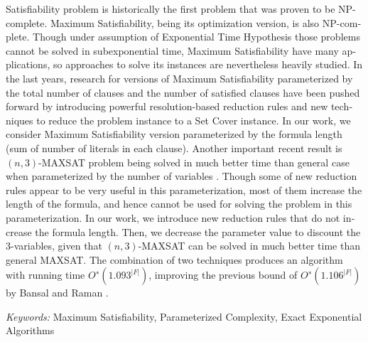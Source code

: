 \begin{otherlanguage}{english}
 Satisfiability problem is historically the first problem that was proven to be NP-complete. Maximum Satisfiability, being its optimization version, is also NP-complete. Though under assumption of Exponential Time Hypothesis those problems cannot be solved in subexponential time, Maximum Satisfiability have many applications, so approaches to solve its instances are nevertheless heavily studied. In the last years, research for versions of Maximum Satisfiability parameterized by the total number of clauses and the number of satisfied clauses have been pushed forward by introducing powerful resolution-based reduction rules and new techniques to reduce the problem instance to a Set Cover instance. In our work, we consider Maximum Satisfiability version parameterized by the formula length (sum of number of literals in each clause). Another important recent result is $(n,3)$-MAXSAT problem being solved in much better time than general case when parameterized by the number of variables \cite{belova18}. Though some of new reduction rules appear to be very useful in this parameterization, most of them increase the length of the formula, and hence cannot be used for solving the problem in this parameterization. In our work, we introduce new reduction rules that do not increase the formula length. Then, we decrease the parameter value to discount the 3-variables, given that $(n,3)$-MAXSAT can be solved in much better time than general MAXSAT. The combination of two techniques produces an algorithm with running time $O^∗(1.093^{|F|})$, improving the previous bound of $O^∗(1.106^{|F|})$ by Bansal and Raman \cite{bansal99}. 

\vspace{14pt}

\textit{Keywords:} Maximum Satisfiability, Parameterized Complexity, Exact Exponential Algorithms
\end{otherlanguage}
